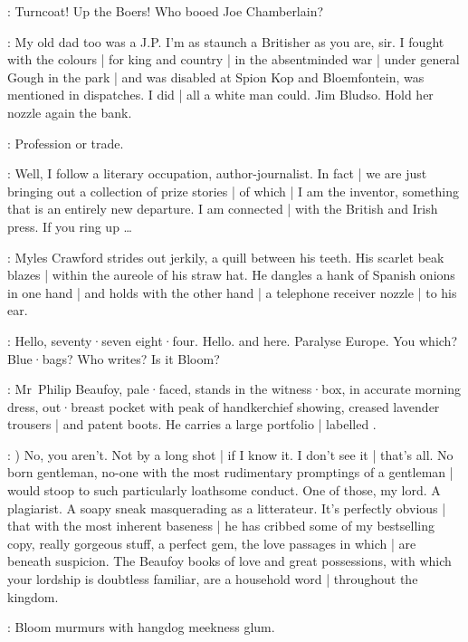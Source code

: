 \Voice:
Turncoat!
Up the Boers!
Who booed Joe Chamberlain?

\Bloom:
My old dad too was a J.P.
I'm as staunch a Britisher as you are,
sir.
I fought with the colours |
for king and country |
in the absentminded war |
under general Gough in the park |
and was disabled at Spion Kop and Bloemfontein,
was mentioned in dispatches.
I did |
all a white man could.
Jim Bludso.
Hold her nozzle again the bank.

\FirstWatch:
Profession or trade.

\Bloom:
Well,
I follow a literary occupation,
author-journalist.
In fact |
we are just bringing out a collection of prize stories |
of which |
I am the inventor,
something that is an entirely new departure.
I am connected |
with the British and Irish press.
If you ring up \ldots

:
Myles Crawford strides out jerkily,
a quill between his teeth.
His scarlet beak blazes |
within the aureole of his straw hat.
He dangles a hank of Spanish onions in one hand |
and holds with the other hand |
a telephone receiver nozzle |
to his ear.

\Myles:
Hello,
seventy·seven eight·four.
Hello.
and 
here.
Paralyse Europe.
You which?
Blue·bags?
Who writes?
Is it Bloom?

:
Mr~Philip Beaufoy,
pale·faced,
stands in the witness·box,
in accurate morning dress,
out·breast pocket with peak of handkerchief showing,
creased lavender trousers |
and patent boots.
He carries a large portfolio |
labelled .

\Beaufoy:
)
No,
you aren't.
Not by a long shot |
if I know it.
I don't see it |
that's all.
No born gentleman,
no-one with the most rudimentary promptings of a gentleman |
would stoop to such particularly loathsome conduct.
One of those,
my lord.
A plagiarist.
A soapy sneak masquerading as a litterateur.
It's perfectly obvious |
that with the most inherent baseness |
he has cribbed some of my bestselling copy,
really gorgeous stuff,
a perfect gem,
the love passages in which |
are beneath suspicion.
The Beaufoy books of love and great possessions,
with which your lordship is doubtless familiar,
are a household word |
throughout the kingdom.

:
Bloom murmurs with hangdog meekness glum.

